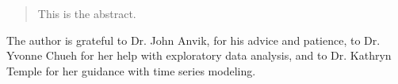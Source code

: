 %
%
%
%
%


\begin{abstract}
  This is the abstract.
\end{abstract}

\begin{acknowledgments}
  The author is grateful to Dr. John Anvik, for his advice and patience, to Dr. Yvonne Chueh for her help with exploratory data analysis, and to Dr. Kathryn Temple for her guidance with time series modeling.
\end{acknowledgments}


\tableofcontents

